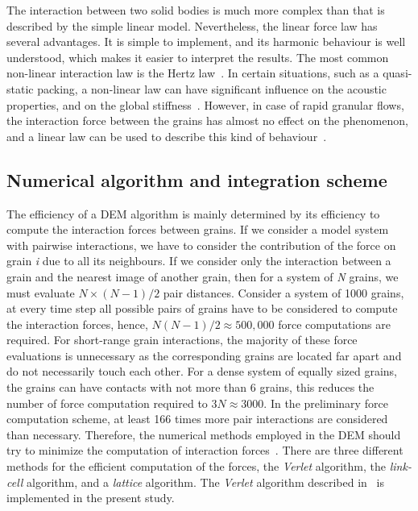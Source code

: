 The interaction between two solid bodies is much more complex than that is 
described by the simple linear model. Nevertheless, the linear force law has 
several advantages. It is simple to implement, and its harmonic behaviour is 
well understood, which makes it easier to interpret the results. The 
most common non-linear interaction law is the Hertz law~\citep{Hertz1882}. In 
certain situations, such as a quasi-static packing, a non-linear law can have 
significant influence on the acoustic properties, and on the global 
stiffness~\citep{Agnolin2007}. However, in case of rapid granular flows, 
the interaction force between the grains has almost no effect on the 
phenomenon, and a linear law can be used to describe this kind of 
behaviour~\citep{Radjai2011}. 


\subsection{Numerical algorithm and integration scheme}
The efficiency of a DEM algorithm is mainly determined by 
its efficiency to compute the interaction forces between grains. If we 
consider a model system with pairwise interactions, we have to consider the 
contribution of the force on grain \textit{i} due to all its neighbours. If we 
consider only the interaction between a grain and the nearest image of another 
grain, then for a system of \textit{N} grains, we must evaluate $N \times 
(N-1)/2$ pair distances. Consider a system of 1000 grains, at every time step 
all possible pairs of grains have to be considered to compute the interaction 
forces, hence, $\mathit{N}(\mathit{N}-1)/2 \approx 500,000$ force computations 
are required. For short-range grain interactions, the majority of these force 
evaluations is unnecessary as the corresponding grains are located far apart 
and do not necessarily touch each other. For a dense system of equally sized 
grains, the grains can have contacts with not more than 6 grains, this reduces 
the number of force computation required to $3\mathit{N} \approx 3000$. In the 
preliminary force computation scheme, at least 166 times more pair interactions 
are considered than necessary. Therefore, the numerical methods employed in the 
DEM should try to minimize the computation of 
interaction forces~\citep{Poschel2005}. There are three different methods for 
the efficient computation of the forces, the \textit{Verlet} algorithm, the 
\textit{link-cell} algorithm, and a \textit{lattice} algorithm. The 
\textit{Verlet} algorithm described in~\citet{Grubmuller1991} 
is implemented in the present study.

